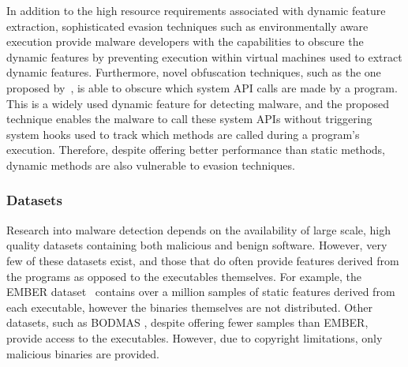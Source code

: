 \documentclass[conference,compsoc]{IEEEtran}
\begin{document}
In addition to the high resource requirements associated with dynamic feature extraction, sophisticated evasion techniques such as environmentally aware execution provide malware developers with the capabilities to obscure the dynamic features by preventing execution within virtual machines used to extract dynamic features. Furthermore, novel obfuscation techniques, such as the one proposed by~\cite{liAPIASONovelAPI2023}, is able to obscure which system API calls are made by a program. This is a widely used dynamic feature for detecting malware, and the proposed technique enables the malware to call these system APIs without triggering system hooks used to track which methods are called during a program's execution. Therefore, despite offering better performance than static methods, dynamic methods are also vulnerable to evasion techniques.

\subsubsection{Datasets}

Research into malware detection depends on the availability of large scale, high quality datasets containing both malicious and benign software. However, very few of these datasets exist, and those that do often provide features derived from the programs as opposed to the executables themselves. For example, the EMBER dataset~\cite{andersonEMBEROpenDataset2018} contains over a million samples of static features derived from each executable, however the binaries themselves are not distributed. Other datasets, such as BODMAS \cite{yangBODMASOpenDataset2021}, despite offering fewer samples than EMBER,  provide access to the executables. However, due to copyright limitations, only malicious binaries are provided. 

\end{document}
